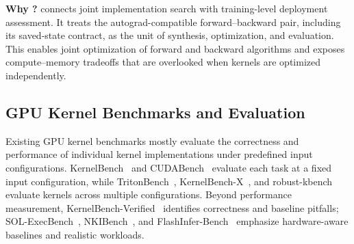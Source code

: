 
\noindent\textbf{Why \method?} \method connects joint implementation search with training-level deployment assessment. It treats the autograd-compatible forward--backward pair, including its saved-state contract, as the unit of synthesis, optimization, and evaluation. This enables joint optimization of forward and backward algorithms and exposes compute--memory tradeoffs that are overlooked when kernels are optimized independently.

\subsection{GPU Kernel Benchmarks and Evaluation}
\label{subsec:related_benchmark}

Existing GPU kernel benchmarks mostly evaluate the correctness and performance of individual kernel implementations under predefined input configurations. KernelBench~\cite{ouyang2025kernelbench} and CUDABench~\cite{cudabench}  evaluate each task at a fixed input configuration, while
TritonBench~\cite{tritonbench}, KernelBench-X~\cite{kernelbenchx}, and robust-kbench~\cite{lange2025robustkbench} evaluate kernels across multiple configurations. Beyond performance measurement, KernelBench-Verified~\cite{zhang2026kernelbenchverified} identifies correctness and baseline pitfalls; SOL-ExecBench~\cite{execbench}, NKIBench~\cite{accelopt}, and FlashInfer-Bench~\cite{flashinferbench} emphasize hardware-aware baselines and realistic workloads.





